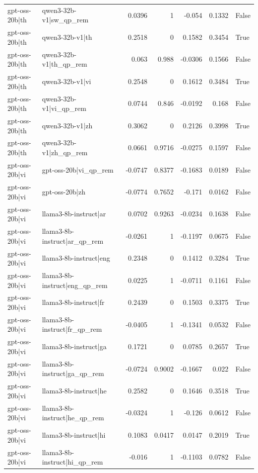 \begin{table}
\begin{tabular}{l l r r r r l}
gpt-oss-20b|th & qwen3-32b-v1|sw_qp_rem & 0.0396 & 1 & -0.054 & 0.1332 & False \\
gpt-oss-20b|th & qwen3-32b-v1|th & 0.2518 & 0 & 0.1582 & 0.3454 & True \\
gpt-oss-20b|th & qwen3-32b-v1|th_qp_rem & 0.063 & 0.988 & -0.0306 & 0.1566 & False \\
gpt-oss-20b|th & qwen3-32b-v1|vi & 0.2548 & 0 & 0.1612 & 0.3484 & True \\
gpt-oss-20b|th & qwen3-32b-v1|vi_qp_rem & 0.0744 & 0.846 & -0.0192 & 0.168 & False \\
gpt-oss-20b|th & qwen3-32b-v1|zh & 0.3062 & 0 & 0.2126 & 0.3998 & True \\
gpt-oss-20b|th & qwen3-32b-v1|zh_qp_rem & 0.0661 & 0.9716 & -0.0275 & 0.1597 & False \\
gpt-oss-20b|vi & gpt-oss-20b|vi_qp_rem & -0.0747 & 0.8377 & -0.1683 & 0.0189 & False \\
gpt-oss-20b|vi & gpt-oss-20b|zh & -0.0774 & 0.7652 & -0.171 & 0.0162 & False \\
gpt-oss-20b|vi & llama3-8b-instruct|ar & 0.0702 & 0.9263 & -0.0234 & 0.1638 & False \\
gpt-oss-20b|vi & llama3-8b-instruct|ar_qp_rem & -0.0261 & 1 & -0.1197 & 0.0675 & False \\
gpt-oss-20b|vi & llama3-8b-instruct|eng & 0.2348 & 0 & 0.1412 & 0.3284 & True \\
gpt-oss-20b|vi & llama3-8b-instruct|eng_qp_rem & 0.0225 & 1 & -0.0711 & 0.1161 & False \\
gpt-oss-20b|vi & llama3-8b-instruct|fr & 0.2439 & 0 & 0.1503 & 0.3375 & True \\
gpt-oss-20b|vi & llama3-8b-instruct|fr_qp_rem & -0.0405 & 1 & -0.1341 & 0.0532 & False \\
gpt-oss-20b|vi & llama3-8b-instruct|ga & 0.1721 & 0 & 0.0785 & 0.2657 & True \\
gpt-oss-20b|vi & llama3-8b-instruct|ga_qp_rem & -0.0724 & 0.9002 & -0.1667 & 0.022 & False \\
gpt-oss-20b|vi & llama3-8b-instruct|he & 0.2582 & 0 & 0.1646 & 0.3518 & True \\
gpt-oss-20b|vi & llama3-8b-instruct|he_qp_rem & -0.0324 & 1 & -0.126 & 0.0612 & False \\
gpt-oss-20b|vi & llama3-8b-instruct|hi & 0.1083 & 0.0417 & 0.0147 & 0.2019 & True \\
gpt-oss-20b|vi & llama3-8b-instruct|hi_qp_rem & -0.016 & 1 & -0.1103 & 0.0782 & False \\

\end{tabular}
\end{table}
